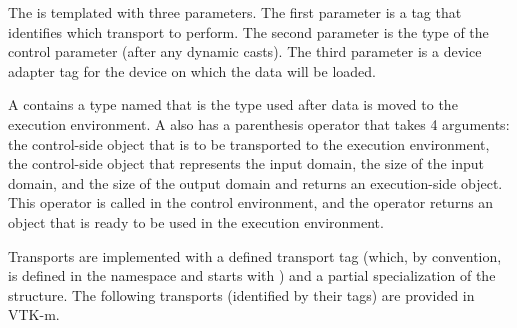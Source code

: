 The   is templated with three
parameters. The first parameter is a tag that identifies which transport to
perform. The second parameter is the type of the control parameter (after any
dynamic casts). The third parameter is a device adapter tag for the device
on which the data will be loaded.

A  contains a type named  that is the type used after data is moved to the execution environment.
A  also has a  parenthesis operator that takes 4 arguments: the control-side object that is to be transported to the execution environment, the control-side object that represents the input domain, the size of the input domain, and the size of the output domain and returns an execution-side object.
This operator is called in the control environment, and the operator returns an object that is ready to be used in the execution environment.

Transports are implemented with a defined transport tag (which, by
convention, is defined in the \vtkmcontarg{} namespace and starts with
) and a partial specialization of the
 structure. The following transports (identified by
their tags) are provided in VTK-m.

